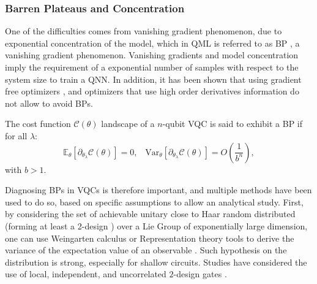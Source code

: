 \documentclass[aps,10pt,groupedaddress,prx,superscriptaddress,twocolumn,balancelastpage, tightenlines]{revtex4-2}
\theoremstyle{plain}  %
\begin{document}
            \subsubsection{Barren Plateaus and Concentration}\label{subsubsec:BP_QNN}

One of the difficulties comes from vanishing gradient phenomenon, due to exponential concentration of the model, which in QML is referred to as \gls{BP} \cite{McClean_2018, larocca_barren_2025}, a
vanishing gradient phenomenon. Vanishing gradients and model concentration imply the requirement of a exponential number of samples with respect to the system size to train a QNN. 
In addition, it has been shown that using gradient free optimizers \cite{arrasmith_effect_2021}, and optimizers that use high order derivatives information \cite{cerezo_higher_2021} do not allow to avoid \gls{BP}s. 


\begin{definition}\label{def:Barren_Plateau}
    The cost function $\mathcal{C}(\theta)$ landscape of a $n$-qubit VQC is
    said to exhibit a \gls{BP} if for all $\lambda$:
    \begin{equation}
        \mathbb{E}_{\theta}[\partial_{\theta_\lambda} \mathcal{C}(\theta)] =
        0, \;\;\; \mathrm{Var}_{\theta}[\partial_{\theta_\lambda}
        \mathcal{C}(\theta)] = O\left(\frac{1}{b^n}\right),
    \end{equation}
    with $b > 1$.
\end{definition}

Diagnosing \gls{BP}s in VQCs is therefore important, and multiple methods have been used to do so, based on specific assumptions to allow an analytical study. First, by considering the set of achievable unitary close to Haar random distributed (forming at least a 2-design \cite{dankert_exact_2009}) over a Lie Group of exponentially large dimension, one can use Weingarten calculus \cite{mele_introduction_2024} or Representation theory tools to derive the variance of the expectation value of an observable \cite{McClean_2018, larocca_diagnosing_2022, fontana_characterizing_2024, ragone_lie_2024, ortiz_marrero_entanglement-induced_2021, mhiri_boson_2026, monbroussou_classical_2026}. Such hypothesis on the distribution is strong, especially for shallow circuits. Studies have considered the use of local, independent, and uncorrelated $2$-design gates \cite{Cerezo_2021_cost_BP, uvarov_barren_2021, pesah2021absence,
liu_presence_2022}. 
\end{document}

